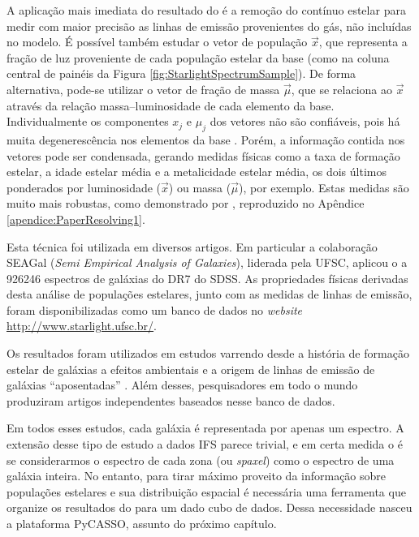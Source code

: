 A aplicação mais imediata do resultado do \starlight é a remoção do contínuo
estelar para medir com maior precisão as linhas de emissão provenientes do gás,
não incluídas no modelo. É possível também estudar o vetor de população
$\vec{x}$, que representa a fração de luz proveniente de cada população estelar
da base (como na coluna central de painéis da Figura
\ref{fig:StarlightSpectrumSample}). De forma alternativa, pode-se utilizar o
vetor de fração de massa $\vec{\mu}$, que se relaciona ao $\vec{x}$ através da
relação massa--luminosidade de cada elemento da base. Individualmente os
componentes $x_j$ e $\mu_j$ dos vetores não são confiáveis, pois há muita
degenerescência nos elementos da base \citep{CidFernandes2005}. Porém, a
informação contida nos vetores pode ser condensada, gerando medidas físicas como
a taxa de formação estelar, a idade estelar média e a metalicidade estelar
média, os dois últimos ponderados por luminosidade ($\vec{x}$) ou massa
($\vec{\mu}$), por exemplo. Estas medidas são muito mais robustas, como
demonstrado por \citet{CidFernandes2014}, reproduzido no Apêndice
\ref{apendice:PaperResolving1}.

Esta técnica foi utilizada em diversos artigos. Em particular a colaboração
SEAGal ({\em Semi Empirical Analysis of Galaxies}), liderada pela UFSC, aplicou
o \starlight a 926246 espectros de galáxias do DR7 do SDSS. As propriedades
físicas derivadas desta análise de populações estelares, junto com as medidas de
linhas de emissão, foram disponibilizadas como um banco de dados no {\em
website} \url{http://www.starlight.ufsc.br/}.

Os resultados foram utilizados em estudos varrendo desde a história de formação
estelar de galáxias \citep{Asari2007} a efeitos ambientais \citep{Mateus2007} e
a origem de linhas de emissão de galáxias ``aposentadas'' \citep{Stasinska2008,
CidFernandes2011}. Além desses, pesquisadores em todo o mundo produziram artigos
independentes \citep[para citar alguns]{Bian2006, Liang2007, Peeples2009,
Lara-Lopez2009, Lara-Lopez2010} baseados nesse banco de dados.

Em todos esses estudos, cada galáxia é representada por apenas um espectro. A
extensão desse tipo de estudo a dados IFS parece trivial, e em certa medida o é
se considerarmos o espectro de cada zona (ou {\em spaxel}) como o espectro de
uma galáxia inteira. No entanto, para tirar máximo proveito da informação sobre
populações estelares e sua distribuição espacial é necessária uma ferramenta que
organize os resultados do \starlight para um dado cubo de dados. Dessa
necessidade nasceu a plataforma PyCASSO, assunto do próximo capítulo.


